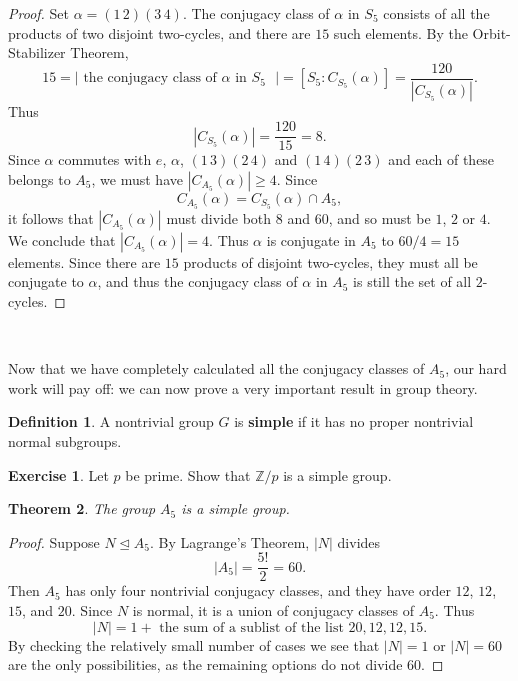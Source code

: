 \documentclass[12pt]{report}
\newtheorem{theorem}{Theorem}[chapter]
\numberwithin{equation}{section}
\numberwithin{theorem}{chapter}
\theoremstyle{definition}
\newtheorem{definition}[theorem]{Definition}
\newtheorem{exercise}{Exercise}
\newtheorem*{basic properties}{Basic Properties}
\newtheorem*{Important Remark}{Important Remark}
\begin{document}
\begin{proof}
\vspace{0.5em}


Set $\alpha = (1 \, 2)(3 \, 4)$. The conjugacy class of $\alpha$ in $S_5$ consists of all the products of two disjoint two-cycles, and there are $15$ such elements. By the Orbit-Stabilizer Theorem,
$$15 = |\text{ the conjugacy class of $\alpha$ in $S_5$ }|
= [S_5: C_{S_5}(\alpha)]=\frac{120}{\left|C_{S_5}(\alpha)\right|}.$$
Thus
$$\left|C_{S_5}(\alpha)\right| = \frac{120}{15} = 8.$$
Since $\alpha$ commutes with $e$, $\alpha$, $(1 \, 3)(2 \, 4)$ and $(1 \, 4)(2 \, 3)$ and each of these belongs to $A_5$, we must have $|C_{A_5}(\alpha)| \geqslant 4$.
Since
$$C_{A_5}(\alpha) = C_{S_5}(\alpha) \cap A_5,$$
it follows that $|C_{A_5}(\alpha)|$ must divide both $8$ and $60$, and so must be $1$, $2$ or $4$.  
We conclude that $|C_{A_5}(\alpha)| = 4$. Thus $\alpha$ is conjugate in $A_5$ to $60/4 = 15$ elements. Since there are $15$ products of disjoint two-cycles, they must all be conjugate to $\alpha$, and thus the conjugacy class of $\alpha$ in $A_5$ is still the set of all $2$-cycles.
\end{proof}


\

 Now that we have completely calculated all the conjugacy classes of $A_5$, our hard work will pay off: we can now prove a very important result in group theory.




\begin{definition}
	A nontrivial group $G$ is {\bf simple} if it has no proper nontrivial normal subgroups.
\end{definition}


\begin{exercise}
	Let $p$ be prime. Show that $\mathbb{Z}/p$ is a simple group.
\end{exercise}


\vspace{0.5em}


\begin{theorem}\label{A5 is simple}
The group $A_5$ is a simple group.
\end{theorem}

\begin{proof} 
Suppose $N \trianglelefteq A_5$. By Lagrange's Theorem, $|N|$ divides 
$$|A_5| = \frac{5!}{2} = 60.$$ 
Then $A_5$ has only four nontrivial conjugacy classes, and they have order $12$, $12$, $15$, and $20$.  Since $N$ is normal, it is a union of conjugacy classes of $A_5$.
Thus
$$|N| = 1 + \text{ the sum of a sublist of the list $20, 12, 12, 15$}.$$
By checking the relatively small number of cases we see that $|N| = 1$ or $|N| = 60$ are the only possibilities, as the remaining options do not divide $60$.
\end{proof}
\end{document}
